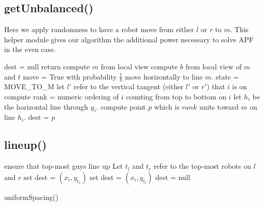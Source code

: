 \documentclass[preprint,10pt]{elsarticle}
\begin{document}
\subsection{getUnbalanced()} 
	Here we apply randomness to have a robot move from either $l$ or $r$ to $m$.
	This helper module gives our algorithm the additional power necessary to 
	solve APF in the even case.
\begin{algorithm}[H]
\begin{algorithmic}[1]
		\State dest = null
		\State return
	\EndIf
	\State compute $m$ from local view
	\State compute $b$ from local view of $m$ and $t$
	\State move = True with probability $\frac{1}{b}$ \Comment move horizontally to line $m$. 
		\State state = MOVE\_TO\_M
		\State let $l'$ refer to the vertical tangent (either $l'$ or $r'$) that $i$ is on
		\State compute rank = numeric ordering of $i$ counting from top to bottom on $i$
		\State let $h_i$ be the horizontal line through $y_i$. 
		\State compute point $p$ which is $rank$ units toward $m$ on line $h_i$.
		\State dest = $p$
	\EndIf


\EndProcedure
\end{algorithmic}
\end{algorithm}


\subsection{lineup()} 
	\begin{algorithm}[H]
	\begin{algorithmic}[1]
		
		\Comment ensure that top-most guys line up
		\State Let $t_l$ and $t_r$ refer to the top-most robots on $l$ and $r$
			\State set dest = $(x_i, y_{t_r})$
			\State set dest = $(x_i, y_{t_l})$
		\Else 
			\State dest = null
		\EndIf

		\State uniformSpacing()
	\EndProcedure
	\end{algorithmic}
	\end{algorithm}
\end{document}
